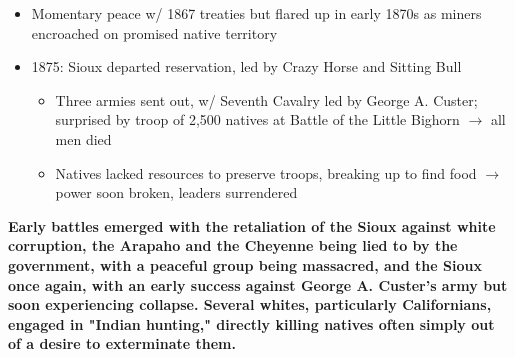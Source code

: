 \documentclass[a4paper]{article}
\begin{document}
{\begin{itemize}
\begin{itemize}
            \item Killings often out of desire to entirely exterminate tribes 
        \end{itemize}
        \item Momentary peace w/ 1867 treaties but flared up in early 1870s as miners encroached on promised native territory
        \item 1875: Sioux departed reservation, led by Crazy Horse and Sitting Bull
        \begin{itemize}
            \item Three armies sent out, w/ Seventh Cavalry led by George A. Custer; surprised by troop of 2,500 natives at Battle of the Little Bighorn $\to$ all men died 
            \item Natives lacked resources to preserve troops, breaking up to find food $\to$ power soon broken, leaders surrendered
        \end{itemize}
    \end{itemize}
    \textbf{Early battles emerged with the retaliation of the Sioux against white corruption, the Arapaho and the Cheyenne being lied to by the government, with a peaceful group being massacred, and the Sioux once again, with an early success against George A. Custer's army but soon experiencing collapse. Several whites, particularly Californians, engaged in "Indian hunting," directly killing natives often simply out of a desire to exterminate them.}}
\end{document}
